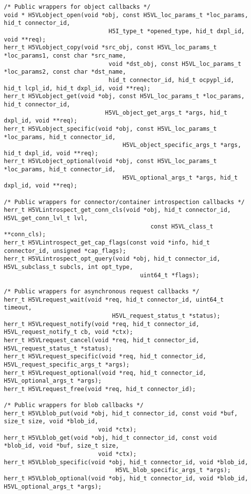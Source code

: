 \begin{appendices}
\begin{lstlisting}
/* Public wrappers for object callbacks */
void * H5VLobject_open(void *obj, const H5VL_loc_params_t *loc_params, hid_t connector_id,
                              H5I_type_t *opened_type, hid_t dxpl_id, void **req);
herr_t H5VLobject_copy(void *src_obj, const H5VL_loc_params_t *loc_params1, const char *src_name,
                              void *dst_obj, const H5VL_loc_params_t *loc_params2, const char *dst_name,
                              hid_t connector_id, hid_t ocpypl_id, hid_t lcpl_id, hid_t dxpl_id, void **req);
herr_t H5VLobject_get(void *obj, const H5VL_loc_params_t *loc_params, hid_t connector_id,
                             H5VL_object_get_args_t *args, hid_t dxpl_id, void **req);
herr_t H5VLobject_specific(void *obj, const H5VL_loc_params_t *loc_params, hid_t connector_id,
                                  H5VL_object_specific_args_t *args, hid_t dxpl_id, void **req);
herr_t H5VLobject_optional(void *obj, const H5VL_loc_params_t *loc_params, hid_t connector_id,
                                  H5VL_optional_args_t *args, hid_t dxpl_id, void **req);

/* Public wrappers for connector/container introspection callbacks */
herr_t H5VLintrospect_get_conn_cls(void *obj, hid_t connector_id, H5VL_get_conn_lvl_t lvl,
                                          const H5VL_class_t **conn_cls);
herr_t H5VLintrospect_get_cap_flags(const void *info, hid_t connector_id, unsigned *cap_flags);
herr_t H5VLintrospect_opt_query(void *obj, hid_t connector_id, H5VL_subclass_t subcls, int opt_type,
                                       uint64_t *flags);

/* Public wrappers for asynchronous request callbacks */
herr_t H5VLrequest_wait(void *req, hid_t connector_id, uint64_t timeout,
                               H5VL_request_status_t *status);
herr_t H5VLrequest_notify(void *req, hid_t connector_id, H5VL_request_notify_t cb, void *ctx);
herr_t H5VLrequest_cancel(void *req, hid_t connector_id, H5VL_request_status_t *status);
herr_t H5VLrequest_specific(void *req, hid_t connector_id, H5VL_request_specific_args_t *args);
herr_t H5VLrequest_optional(void *req, hid_t connector_id, H5VL_optional_args_t *args);
herr_t H5VLrequest_free(void *req, hid_t connector_id);

/* Public wrappers for blob callbacks */
herr_t H5VLblob_put(void *obj, hid_t connector_id, const void *buf, size_t size, void *blob_id,
                           void *ctx);
herr_t H5VLblob_get(void *obj, hid_t connector_id, const void *blob_id, void *buf, size_t size,
                           void *ctx);
herr_t H5VLblob_specific(void *obj, hid_t connector_id, void *blob_id,
                                H5VL_blob_specific_args_t *args);
herr_t H5VLblob_optional(void *obj, hid_t connector_id, void *blob_id, H5VL_optional_args_t *args);


\end{lstlisting}
\end{appendices}

